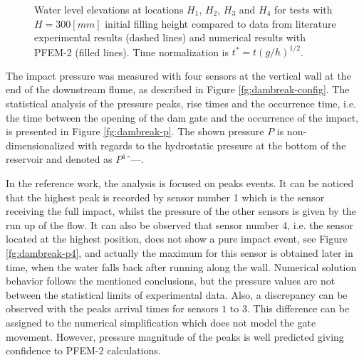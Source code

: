 \begin{figure}[h]
{    }
   \caption{Water level elevations at locations $H_1$, $H_2$, $H_3$ and $H_4$ for tests with $H=300[mm]$ initial filling height compared to data from literature experimental results\cite{Lobovsky13} (dashed lines) and numerical results with PFEM-2 (filled lines). Time normalization is $t^*=t(g/h)^{1/2}$.}
   \label{fg:dambreak-h}                %
\end{figure}

The impact pressure was measured with four sensors at the vertical wall at the end of the downstream flume, as described in Figure \ref{fg:dambreak-config}. The statistical analysis of the pressure peaks, rise times and the occurrence time, i.e. the time between
the opening of the dam gate and the occurrence of the impact, is presented in Figure \ref{fg:dambreak-p}. The shown pressure $P$ is non-dimensionalized with regards to the hydrostatic pressure at the bottom of the reservoir and denoted as $P^â$.

In the reference work, the analysis is focused on peaks events. It can be noticed that the highest peak is recorded by sensor number 1 which is the sensor receiving the full impact, whilst the pressure of the other sensors is given by the run up of the flow. It can also be observed that sensor number 4, i.e. the sensor located at the highest position, does not show a pure impact event, see Figure \ref{fg:dambreak-p4}, and actually the maximum for this sensor is obtained later in time, when the water falls back after running along the wall. Numerical solution behavior follows the mentioned conclusions, but the pressure values are not between the statistical limits of experimental data. Also, a discrepancy can be observed with the peaks arrival times for sensors $1$ to $3$. This difference can be assigned to the numerical simplification which does not model the gate movement. However, pressure magnitude of the peaks is well predicted giving confidence to PFEM-2 calculations. 

